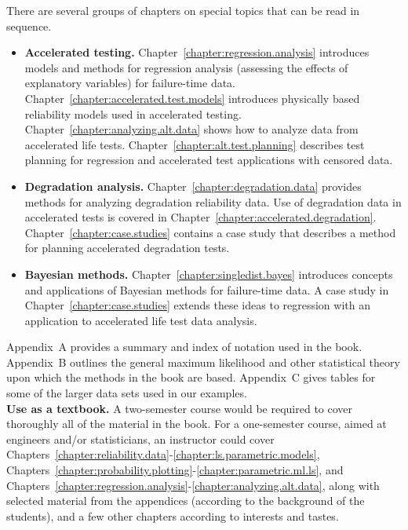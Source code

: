 There are several groups of chapters on special topics that can be
read in sequence.

\begin{itemize}
\item
{\bf Accelerated testing.} Chapter~\ref{chapter:regression.analysis}
introduces models and methods for regression analysis (assessing the
effects of explanatory variables) for failure-time data.
Chapter~\ref{chapter:accelerated.test.models} introduces physically
based reliability models used in accelerated testing.
Chapter~\ref{chapter:analyzing.alt.data} shows how to analyze data
from accelerated life tests.
Chapter~\ref{chapter:alt.test.planning} describes test planning for
regression and accelerated test applications with censored data.
\item
{\bf Degradation analysis.} Chapter~\ref{chapter:degradation.data}
provides methods for analyzing degradation reliability data. Use of
degradation data in accelerated tests is covered in
Chapter~\ref{chapter:accelerated.degradation}.
Chapter~\ref{chapter:case.studies} contains a case study that
describes a method for planning accelerated degradation tests.
\item
{\bf Bayesian methods.} Chapter~\ref{chapter:singledist.bayes}
introduces concepts and applications of Bayesian methods for
failure-time data. A case study in
Chapter~\ref{chapter:case.studies} extends these ideas to regression
with an application to accelerated life test data analysis.
\end{itemize}

Appendix~A provides a summary and index of notation used in the
book.  Appendix~B outlines the general maximum likelihood and other
statistical theory upon which the methods in the book are based.
Appendix~C gives tables for some of the larger data sets used in our
examples.\\[3ex]

\noindent
{\bf Use as a textbook.}  A two-semester course would be required
to cover thoroughly all of the material in the book.  For a
one-semester course, aimed at engineers and/or statisticians, an
instructor could cover
Chapters~\ref{chapter:reliability.data}-\ref{chapter:ls.parametric.models},
Chapters~\ref{chapter:probability.plotting}-\ref{chapter:parametric.ml.ls},
and
Chapters~\ref{chapter:regression.analysis}-\ref{chapter:analyzing.alt.data},
along with selected material from the appendices (according to the
background of the students), and a few other chapters according to
interests and tastes.

